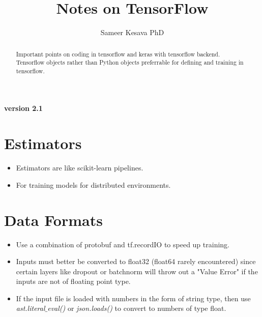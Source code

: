 \documentclass[11pt]{article}
\title{Notes on TensorFlow}
\author{Sameer Kesava PhD}
\begin{document}
\maketitle
\begin{abstract}
\noindent Important points on coding in tensorflow and keras with tensorflow backend. Tensorflow objects rather than Python objects preferrable for defining and training in tensorflow.
\end{abstract}





\begin{multicols*}{2}

\paragraph{version 2.1 \label{version}}
\section{Estimators}
\begin{itemize}
\item Estimators are like scikit-learn pipelines.
\item For training models for distributed environments.
\end{itemize}

\section{Data Formats}
\begin{itemize}
\item Use a combination of protobuf and tf.recordIO to speed up training.
\item Inputs must better be converted to float32 (float64 rarely encountered) since certain layers like dropout or batchnorm will throw out a "Value Error" if the inputs are not of floating point type.
\item If the input file is loaded with numbers in the form of string type, then use \textit{ast.literal$\_$eval()} or \textit{json.loads()} to convert to numbers of type float.
\end{itemize}


\end{multicols*}
\end{document}
